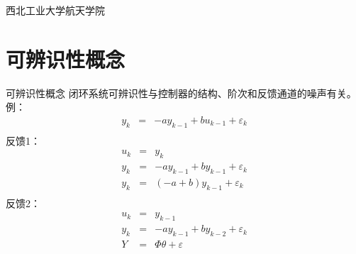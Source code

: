 
\newcommand{\vect}[1]{\boldsymbol{#1}}

\def\lecturename{系统辨识}

\title{\insertlecture}

\author{邢超}

\institute
{
  西北工业大学航天学院
}


\subtitle{}
\date{2012}



\begin{frame}
  \maketitle
\end{frame}


\section{可辨识性概念}
\begin{frame}{可辨识性概念}
闭环系统可辨识性与控制器的结构、阶次和反馈通道的噪声有关。
例：
\begin{eqnarray*}
y_k &=& -ay_{k-1}+b u_{k-1}+\varepsilon_k \\
\end{eqnarray*}
反馈1：
\begin{eqnarray*}
u_k &=&  y_k \\
y_k &=& -ay_{k-1}+b y_{k-1}+\varepsilon_k \\
y_k &=& (-a+b) y_{k-1}+\varepsilon_k \\
\end{eqnarray*}
反馈2：
\begin{eqnarray*}
u_k &=&  y_{k-1} \\
y_k &=& -ay_{k-1}+b y_{k-2}+\varepsilon_k \\
Y &=& \Phi \theta +\varepsilon
\end{eqnarray*}
\end{frame}

